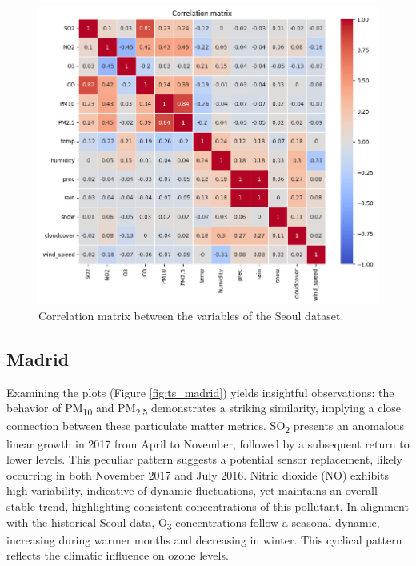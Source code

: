 \begin{figure}[h]
    \centering
    \includegraphics[width=0.75\linewidth]{images/corr_matrix_seoul.png}
    \caption{Correlation matrix between the variables of the Seoul dataset.}
    \label{fig:corr_matrix_seoul}
\end{figure}

\newpage
\subsection{Madrid}
\label{subsec:madrid-eda}
Examining the plots (Figure \ref{fig:ts_madrid}) yields insightful observations:
the behavior of PM\textsubscript{10} and PM\textsubscript{2.5} demonstrates a striking similarity, implying a close connection between these particulate matter metrics.
SO\textsubscript{2} presents an anomalous linear growth in 2017 from April to November, followed by a subsequent return to lower levels. This peculiar pattern suggests a potential sensor replacement, likely occurring in both November 2017 and July 2016.
Nitric dioxide (NO) exhibits high variability, indicative of dynamic fluctuations, yet maintains an overall stable trend, highlighting consistent concentrations of this pollutant.
In alignment with the historical Seoul data, O\textsubscript{3} concentrations follow a seasonal dynamic, increasing during warmer months and decreasing in winter. This cyclical pattern reflects the climatic influence on ozone levels.

